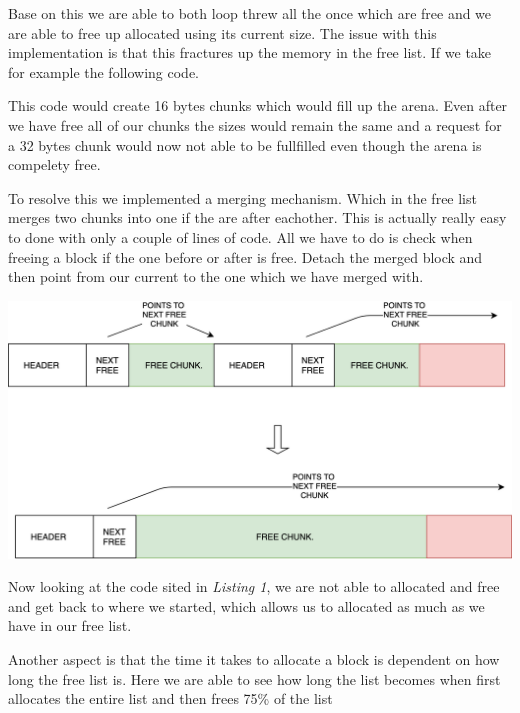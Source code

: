 \documentclass{article}
\begin{document}
Base on this we are able to both loop threw all the once which are free and we are able to free up allocated using its current size. The issue with this implementation is that this fractures up the memory in the free list. If we take for example the following code.





This code would create 16 bytes chunks which would fill up the arena. Even after we have free all of our chunks the sizes would remain the same and a request for a 32 bytes chunk would now not able to be fullfilled even though the arena is compelety free.



To resolve this we implemented a merging mechanism. Which in the free list merges two chunks into one if the are after eachother. This is actually really easy to done with only a couple of lines of code. All we have to do is check when freeing a block if the one before or after is free. Detach the merged block and then point from our current to the one which we have merged with. \newline

\begin{center}
    \includegraphics[scale=0.12]{images/merging-example.png}
\end{center}
     

Now looking at the code sited in \emph{Listing 1}, we are not able to allocated and free and get back to where we started, which allows us to allocated as much as we have in our free list.

Another aspect is that the time it takes to allocate a block is dependent on how long the free list is. Here we are able to see how long the list becomes when first allocates the entire list and then frees 75\% of the list
\end{document}
